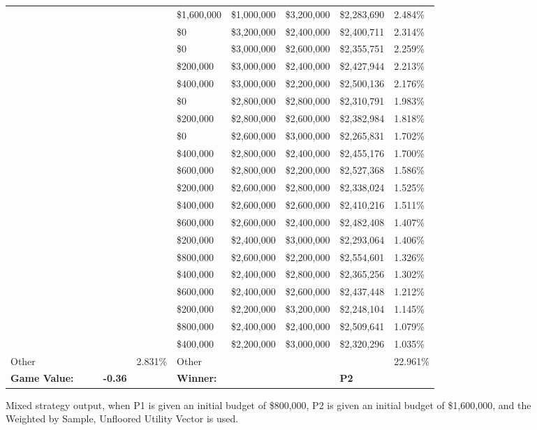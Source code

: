\documentclass[11pt]{article}
\begin{document}
\begin{figure}
\begin{tabular}{ |p{1.0cm}p{1.0cm}p{1.0cm}p{2.0cm}|p{1.0cm}||p{1.0cm}p{1.0cm}p{1.0cm}p{2.0cm}|p{1.0cm}|}
&&&& & \$1,600,000 & \$1,000,000 & \$3,200,000 & \$2,283,690 & 2.484\% \\
&&&& & \$0 & \$3,200,000 & \$2,400,000 & \$2,400,711 & 2.314\% \\
&&&& & \$0 & \$3,000,000 & \$2,600,000 & \$2,355,751 & 2.259\% \\
&&&& & \$200,000 & \$3,000,000 & \$2,400,000 & \$2,427,944 & 2.213\% \\
&&&& & \$400,000 & \$3,000,000 & \$2,200,000 & \$2,500,136 & 2.176\% \\
&&&& & \$0 & \$2,800,000 & \$2,800,000 & \$2,310,791 & 1.983\% \\
&&&& & \$200,000 & \$2,800,000 & \$2,600,000 & \$2,382,984 & 1.818\% \\
&&&& & \$0 & \$2,600,000 & \$3,000,000 & \$2,265,831 & 1.702\% \\
&&&& & \$400,000 & \$2,800,000 & \$2,400,000 & \$2,455,176 & 1.700\% \\
&&&& & \$600,000 & \$2,800,000 & \$2,200,000 & \$2,527,368 & 1.586\% \\
&&&& & \$200,000 & \$2,600,000 & \$2,800,000 & \$2,338,024 & 1.525\% \\
&&&& & \$400,000 & \$2,600,000 & \$2,600,000 & \$2,410,216 & 1.511\% \\
&&&& & \$600,000 & \$2,600,000 & \$2,400,000 & \$2,482,408 & 1.407\% \\
&&&& & \$200,000 & \$2,400,000 & \$3,000,000 & \$2,293,064 & 1.406\% \\
&&&& & \$800,000 & \$2,600,000 & \$2,200,000 & \$2,554,601 & 1.326\% \\
&&&& & \$400,000 & \$2,400,000 & \$2,800,000 & \$2,365,256 & 1.302\% \\
&&&& & \$600,000 & \$2,400,000 & \$2,600,000 & \$2,437,448 & 1.212\% \\
&&&& & \$200,000 & \$2,200,000 & \$3,200,000 & \$2,248,104 & 1.145\% \\
&&&& & \$800,000 & \$2,400,000 & \$2,400,000 & \$2,509,641 & 1.079\% \\
&&&& & \$400,000 & \$2,200,000 & \$3,000,000 & \$2,320,296 & 1.035\% \\
\hline
Other &&&& 2.831\% & Other &&&& 22.961\% \\
\hline
\small \textbf{Game Value:} &&& \small \textbf{ -0.36} && \small \textbf{Winner:} &&& \small \textbf{P2}&\\
\hline
\end{tabular}
\caption{Mixed strategy output, when P1 is given an initial budget of \$800,000, P2 is given an initial budget of \$1,600,000, and the Weighted by Sample, Unfloored Utility Vector is used.}
\label{8v16table.6}
\end{figure}
\end{document}
